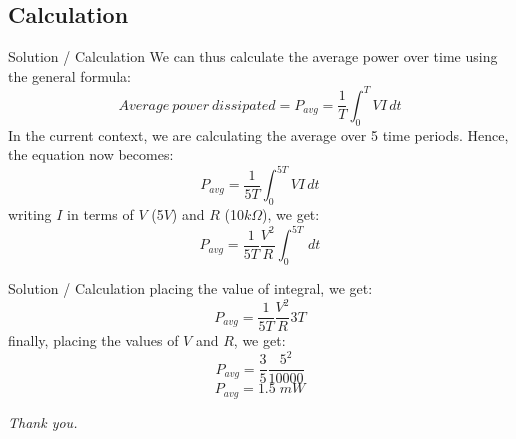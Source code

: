 \documentclass{beamer}
\begin{document}
\subsection{Calculation}
\begin{frame}{Solution / Calculation}
    We can thus calculate the average power over time using the general formula:
\begin{equation}
    Average\:power\:dissipated = P_{avg}=\frac{1}{T}\int_{0}^{T} VI \,dt
\end{equation}
    In the current context, we are calculating the average over 5 time periods. Hence, the equation now becomes:
\begin{equation} 
    P_{avg}=\frac{1}{5T}\int_{0}^{5T} VI \,dt
\end{equation}
    writing $I$ in terms of $V$ (5$V$) and $R$ (10$k\Omega$), we get:
\begin{equation}
    P_{avg}=\frac{1}{5T}\frac{V^2}{R}\int_{0}^{5T}\,dt
\end{equation}
\end{frame}

\begin{frame}{Solution / Calculation}
placing the value of integral, we get:
\begin{equation}
    P_{avg}=\frac{1}{5T}\frac{V^2}{R}3T
\end{equation}
finally, placing the values of $V$ and $R$, we get:
\begin{equation}
    P_{avg}=\frac{3}{5}\frac{5^2}{10000}
\end{equation}
\begin{equation}
\boxed{
    P_{avg}=1.5\;mW }
\end{equation}
\end{frame}

\begin{frame}
    \centering
    \textit{Thank you.}
\end{frame}
\end{document}
